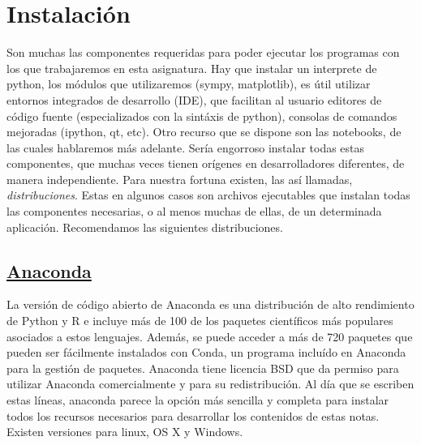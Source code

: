 \section{Instalación}


Son muchas las componentes requeridas para poder ejecutar los programas con los que trabajaremos 
en esta asignatura. Hay que instalar un interprete de python, los módulos que utilizaremos 
(sympy, matplotlib), es útil utilizar entornos integrados de desarrollo (IDE), que facilitan al usuario
editores de código fuente (especializados con la sintáxis de python), consolas de comandos
mejoradas (ipython, qt, etc). Otro recurso que se dispone son las notebooks, de las cuales 
hablaremos más adelante. Sería engorroso instalar todas estas componentes, que muchas veces 
tienen orígenes en desarrolladores diferentes, de manera independiente. Para nuestra fortuna
existen, las así llamadas, \emph{distribuciones}. Estas en algunos casos son archivos ejecutables que instalan todas 
las componentes necesarias, o al menos muchas  de ellas, de un determinada aplicación.
Recomendamos las siguientes distribuciones.  

\subsection{\href{https://www.continuum.io/downloads}{Anaconda}} 
La versión de código abierto de Anaconda es una distribución de alto rendimiento de Python y R 
e incluye más de 100 de los paquetes científicos más populares asociados a estos lenguajes.
Además, se puede acceder a más de 720 paquetes que pueden ser fácilmente instalados con Conda, 
 un programa incluído en Anaconda para la gestión de paquetes.
 Anaconda tiene licencia BSD que da permiso para utilizar Anaconda comercialmente 
 y para su redistribución. Al día que se escriben estas líneas, anaconda parece la opción más 
 sencilla y completa para instalar todos los recursos necesarios para desarrollar los contenidos de 
 estas notas. Existen versiones para linux, OS X y Windows. 



